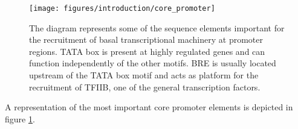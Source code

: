 \begin{figure}[!ht]
  
    \texttt{[image: figures/introduction/core\_promoter]}
    \label{coreprom}
    \caption{The diagram represents some of the sequence elements important for the recruitment of basal transcriptional machinery at promoter regions. TATA box is present at highly regulated genes and can function independently of the other motifs. BRE is usually located upstream of the TATA box motif and acts as platform for the recruitment of TFIIB, one of the general transcription factors.   }
\end{figure}

A representation of the most important core promoter elements is depicted in figure \ref{coreprom}. 


